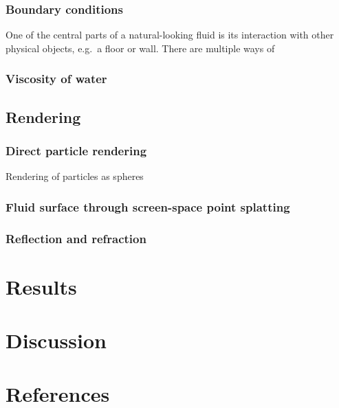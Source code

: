 \documentclass[paper=a4, fontsize=11pt]{report}
\numberwithin{equation}{section} %
\numberwithin{figure}{section} %
\numberwithin{table}{section} %
\begin{document}
\subsection{Boundary conditions}
One of the central parts of a natural-looking fluid is its interaction with other physical objects, e.g.\ a floor or wall. There are multiple ways of 

\subsection{Viscosity of water}

\section{Rendering}
\subsection{Direct particle rendering}
Rendering of particles as spheres

\subsection{Fluid surface through screen-space point splatting}
\subsection{Reflection and refraction}

\chapter{Results}

\chapter{Discussion}

\chapter{References}
\end{document}
